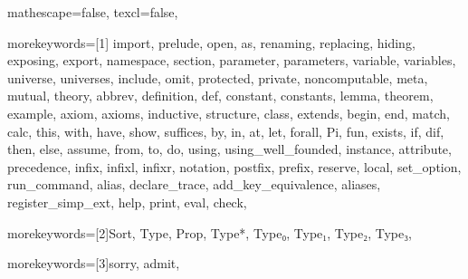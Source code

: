 
 {

mathescape=false,
texcl=false,

morekeywords=[1]{
import, prelude,
open, as, renaming, replacing, hiding, exposing, export,
namespace, section,
parameter, parameters, variable, variables, universe, universes, include, omit,
protected, private, noncomputable, meta, mutual, theory, abbrev,
definition, def, constant, constants, lemma, theorem, example, axiom, axioms,
inductive, structure, class, extends,
begin, end, match, calc, this, with, have, show, suffices, by, in, at, let, forall, Pi, fun,
exists, if, dif, then, else, assume, from, to, do,
using, using_well_founded,
instance, attribute,
precedence, infix, infixl, infixr, notation, postfix, prefix,
reserve, local,
set_option, run_command,
alias, declare_trace, add_key_equivalence, aliases, register_simp_ext,
help, print, eval, check},

morekeywords=[2]{Sort, Type, Prop, Type*, Type₀, Type₁, Type₂, Type₃},

morekeywords=[3]{sorry, admit},



}
